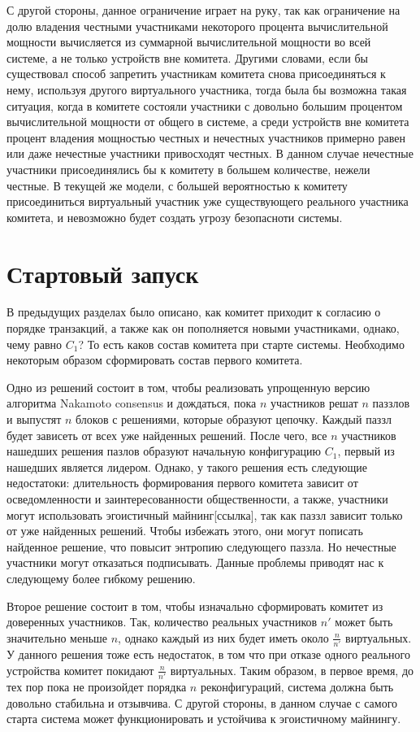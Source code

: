 С другой стороны, данное ограничение играет на руку, так как ограничение на долю владения честными участниками некоторого процента вычислительной мощности вычисляется из суммарной вычислительной мощности во всей системе, а не только устройств вне комитета. Другими словами, если бы существовал способ запретить участникам комитета снова присоединяться к нему, используя другого виртуального участника, тогда была бы возможна такая ситуация, когда в комитете состояли участники с довольно большим процентом вычислительной мощности от общего в системе, а среди устройств вне комитета процент владения мощностью честных и нечестных участников примерно равен или даже нечестные участники привосходят честных. В данном случае нечестные участники присоединялись бы к комитету в большем количестве, нежели честные. В текущей же модели, с большей вероятностью к комитету присоединиться виртуальный участник уже существующего реального участника комитета, и невозможно будет создать угрозу безопасноти системы.

\section{Стартовый запуск}
В предыдущих разделах было описано, как комитет приходит к согласию о порядке транзакций, а также как он пополняется новыми участниками, однако, чему равно $C_1$? То есть каков состав комитета при старте системы. Необходимо некоторым образом сформировать состав первого комитета.

Одно из решений состоит в том, чтобы реализовать упрощенную версию алгоритма Nakamoto consensus и дождаться, пока $n$ участников решат $n$ паззлов и выпустят $n$ блоков с решениями, которые образуют цепочку. Каждый паззл будет зависеть от всех уже найденных решений. После чего, все $n$ участников нашедших решения пазлов образуют начальную конфигурацию $C_1$, первый из нашедших является лидером.
Однако, у такого решения есть следующие недостатоки: длительность формирования первого комитета зависит от осведомленности и заинтересованности общественности, а также, участники могут использовать эгоистичный майнинг[ссылка], так как паззл зависит только от уже найденных решений. Чтобы избежать этого, они могут пописать найденное решение, что повысит энтропию следующего паззла. Но нечестные участники могут отказаться подписывать. Данные проблемы приводят нас к следующему более гибкому решению.

Второе решение состоит в том, чтобы изначально сформировать комитет из доверенных участников. Так, количество реальных участников $n'$ может быть значительно меньше $n$, однако каждый из них будет иметь около $\frac{n}{n'}$ виртуальных. У данного решения тоже есть недостаток, в том что при отказе одного реального устройства комитет покидают $\frac{n}{n'}$ виртуальных. Таким образом, в первое время, до тех пор пока не произойдет порядка $n$ реконфигураций, система должна быть довольно стабильна и отзывчива.
С другой стороны, в данном случае с самого старта система может функционировать и устойчива к эгоистичному майнингу.

